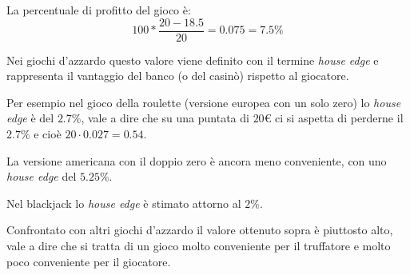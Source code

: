 La percentuale di profitto del gioco è:
\[
100*\frac{20-18.5}{20}=0.075=7.5\%
\]


Nei giochi d'azzardo questo valore viene definito 
con il termine \emph{house edge} e rappresenta 
il vantaggio del banco (o del casinò) rispetto al giocatore.

Per esempio nel gioco della roulette (versione europea con un solo zero)
lo \emph{house edge} è del $2.7\%$, vale a dire che su una puntata di 
$20$\euro\hspace{1mm} ci si aspetta di perderne il $2.7\%$ e cioè
$20\cdot 0.027=0.54$.

La versione americana con il doppio zero è ancora meno conveniente, con 
uno \emph{house edge} del $5.25\%$.

Nel blackjack lo \emph{house edge} è stimato attorno al $2\%$.

Confrontato con altri giochi d'azzardo il valore ottenuto sopra 
è piuttosto alto,
vale a dire che si tratta di un gioco molto conveniente per il truffatore 
e molto poco conveniente per il giocatore.

